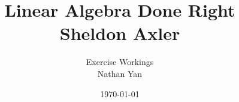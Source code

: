 \documentclass[12pt]{article}
\title{Linear Algebra Done Right\\[0.5em]
	\large Sheldon Axler}
\author{Exercise Workings\\[0.5em]
 Nathan Yan}
\date{\today}
\begin{document}






\renewcommand{\null}{\text{null }}



\renewcommand{\Re}{\operatorname{Re}}
\renewcommand{\Im}{\operatorname{Im}}



\newcommand{\M}{\mathcal M}


\end{document}
